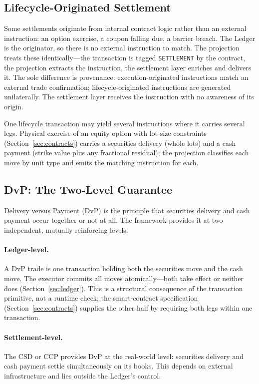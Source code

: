 \documentclass[11pt,a4paper]{article}
\begin{document}
\subsection{Lifecycle-Originated Settlement}
\label{sec:settlement-lifecycle}

Some settlements originate from internal contract logic rather than an external instruction: an option exercise, a coupon falling due, a barrier breach. The Ledger is the originator, so there is no external instruction to match. The projection treats these identically---the transaction is tagged \texttt{SETTLEMENT} by the contract, the projection extracts the instruction, the settlement layer enriches and delivers it. The sole difference is provenance: execution-originated instructions match an external trade confirmation; lifecycle-originated instructions are generated unilaterally. The settlement layer receives the instruction with no awareness of its origin.

One lifecycle transaction may yield several instructions where it carries several legs. Physical exercise of an equity option with lot-size constraints (Section~\ref{sec:contracts}) carries a securities delivery (whole lots) and a cash payment (strike value plus any fractional residual); the projection classifies each move by unit type and emits the matching instruction for each.

\subsection{DvP: The Two-Level Guarantee}
\label{sec:settlement-dvp}

Delivery versus Payment (DvP) is the principle that securities delivery and cash payment occur together or not at all. The framework provides it at two independent, mutually reinforcing levels.

\paragraph{Ledger-level.} A DvP trade is one transaction holding both the securities move and the cash move. The executor commits all moves atomically---both take effect or neither does (Section~\ref{sec:ledger}). This is a structural consequence of the transaction primitive, not a runtime check; the smart-contract specification (Section~\ref{sec:contracts}) supplies the other half by requiring both legs within one transaction.

\paragraph{Settlement-level.} The CSD or CCP provides DvP at the real-world level: securities delivery and cash payment settle simultaneously on its books. This depends on external infrastructure and lies outside the Ledger's control.
\end{document}
